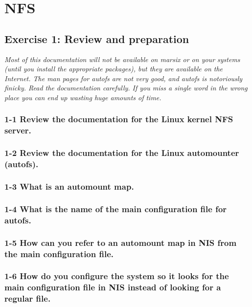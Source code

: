 
\chapter{NFS}
\section{Exercise 1: Review and preparation}
\em Most of this documentation will not be available on marsix or on your systems (until you install the appropriate packages), but they are available on the Internet. The man pages for autofs are not very good, and autofs is notoriously finicky. Read the documentation carefully. If you miss a single word in the wrong place you can end up wasting huge amounts of time.\em

\subsection{1-1 Review the documentation for the Linux kernel NFS server.}

\subsection{1-2 Review the documentation for the Linux automounter (autofs).}

\subsection{1-3 What is an automount map.}

\subsection{1-4 What is the name of the main configuration file for autofs.}

\subsection{1-5 How can you refer to an automount map in NIS from the main configuration file.}

\subsection{1-6 How do you configure the system so it looks for the main configuration file in NIS instead of looking for a regular file.}


